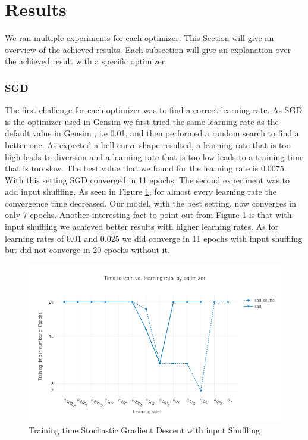 

\section{Results}\label{sec:results}
We ran multiple experiments for each optimizer. This Section will  give an overview of the achieved results. Each subsection will give an explanation over the achieved result with a specific optimizer.

\subsubsection{SGD}
The first challenge for each optimizer was to find a correct learning rate. As SGD is the optimizer used in Gensim \cite{gensim} we first tried the same learning rate as the default value in Gensim \cite{gensim}, i.e 0.01,  and then performed a random search to find a better one. As expected a bell curve shape resulted, a learning rate that is too high leads to diversion and a learning rate that is too low leads to a training time that is too slow. The best value that we found for the learning rate is $0.0075$. With this setting SGD converged in 11 epochs. The second experiment was to add input shuffling.
As seen in Figure \ref{fig:results_sgd}, for almost every learning rate the convergence time decreased. Our model, with the best setting, now converges in only 7 epochs. Another interesting fact to point out from Figure \ref{fig:results_sgd} is that with input shuffling we achieved better results with higher learning rates. As for learning rates of $0.01$ and $0.025$ we did converge in 11 epochs with input shuffling but did not converge in 20 epochs without it.

\begin{figure}[h]
\centering
\includegraphics[scale=0.3]{images/results_sgd_shuffle}
\caption{Training time Stochastic Gradient Descent with input Shuffling}
\label{fig:results_sgd}
\end{figure}
